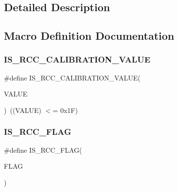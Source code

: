 \subsection{Detailed Description}


\subsection{Macro Definition Documentation}
\mbox{\label{group___r_c_c___flag_gafda50a08dc048f7c272bf04ec9c2c2b7}} 
\subsubsection{\texorpdfstring{IS\_RCC\_CALIBRATION\_VALUE}{IS\_RCC\_CALIBRATION\_VALUE}}
{\footnotesize\ttfamily \#define I\+S\+\_\+\+R\+C\+C\+\_\+\+C\+A\+L\+I\+B\+R\+A\+T\+I\+O\+N\+\_\+\+V\+A\+L\+UE(\begin{DoxyParamCaption}\item[{}]{V\+A\+L\+UE }\end{DoxyParamCaption})~((V\+A\+L\+UE) $<$= 0x1\+F)}

\mbox{\label{group___r_c_c___flag_gaa27dea5bb62b26d0881e649770252158}} 
\subsubsection{\texorpdfstring{IS\_RCC\_FLAG}{IS\_RCC\_FLAG}}
{\footnotesize\ttfamily \#define I\+S\+\_\+\+R\+C\+C\+\_\+\+F\+L\+AG(\begin{DoxyParamCaption}\item[{}]{F\+L\+AG }\end{DoxyParamCaption})}

